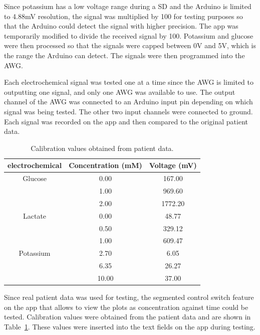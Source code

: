 Since potassium has a low voltage range during a SD and the Arduino is limited to 4.88mV resolution, the signal was multiplied by 100 for testing purposes so that the Arduino could detect the signal with higher precision. The app was temporarily modified to divide the received signal by 100. Potassium and glucose were then processed so that the signals were capped between 0V and 5V, which is the range the Arduino can detect. The signals were then programmed into the AWG. 

Each electrochemical signal was tested one at a time since the AWG is limited to outputting one signal, and only one AWG was available to use. The output channel of the AWG was connected to an Arduino input pin depending on which signal was being tested. The other two input channels were connected to ground. Each signal was recorded on the app and then compared to the original patient data.

\begin{table}[h!]
\centering
\begin{tabular}{||c c c||} 
 \hline
 electrochemical & Concentration (mM) & Voltage (mV) \\ [0.5ex]
 \hline\hline
 Glucose & 0.00 & 167.00 \\
  & 1.00 & 969.60 \\
  & 2.00 & 1772.20 \\
 Lactate & 0.00 & 48.77 \\
  & 0.50 & 329.12 \\
  & 1.00 & 609.47 \\
 Potassium & 2.70 & 6.05 \\
  & 6.35 & 26.27 \\
  & 10.00 & 37.00 \\
 \hline
\end{tabular}
\caption{Calibration values obtained from patient data.}
\label{table: test2 calibration}
\end{table}

Since real patient data was used for testing, the segmented control switch feature on the app that allows to view the plots as concentration against time could be tested. Calibration values were obtained from the patient data \cite{Rogers2017} and are shown in Table~\ref{table: test2 calibration}. These values were inserted into the text fields on the app during testing.

